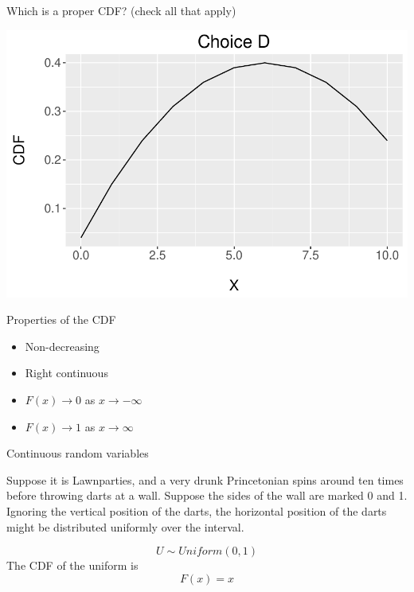 \documentclass{beamer}
\begin{document}
\begin{frame}{Which is a proper CDF? (check all that apply)}
\begin{center}
\includegraphics[scale=.32]{figures/CDF4.pdf}
\end{center}
\end{frame}

\begin{frame}{Properties of the CDF}
\begin{itemize}
\item Non-decreasing
\item Right continuous
\item $F(x)\rightarrow 0$ as $x\rightarrow -\infty$
\item $F(x)\rightarrow 1$ as $x\rightarrow \infty$
\end{itemize}
\end{frame}

\begin{frame}{Continuous random variables}

Suppose it is Lawnparties, and a very drunk Princetonian spins around ten times before throwing darts at a wall. Suppose the sides of the wall are marked 0 and 1. Ignoring the vertical position of the darts, the horizontal position of the darts might be distributed \alert{uniformly} over the interval.

$$U\sim Uniform(0,1)$$
The CDF of the uniform is
$$F(x)=x$$
\end{frame}
\end{document}
